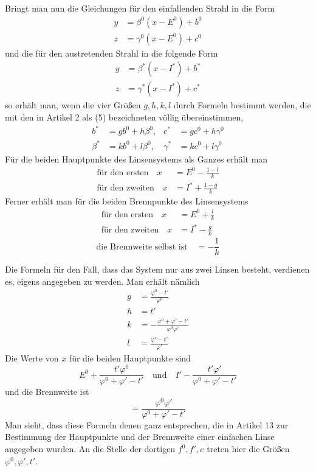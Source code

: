 Bringt man nun die Gleichungen für den einfallenden Strahl in die Form
\[
\begin{aligned}
y&=\beta^0(x-E^0)+b^0\\
z&=\gamma^0(x-E^0)+c^0
\end{aligned}
\]
und die für den austretenden Strahl in die folgende Form
\[
\begin{aligned}
y&=\beta^*(x-I^*)+b^*\\
z&=\gamma^*(x-I^*)+c^*
\end{aligned}
\]
so erhält man, wenn die vier Größen $g,h,k,l$ durch Formeln bestimmt werden, die mit den in Artikel 2 als (5) bezeichneten völlig übereinstimmen,
\[
\begin{aligned}
b^*&=gb^0+h\beta^0,&c^*&=gc^0+h\gamma^0\\
\beta^*&=kb^0+l\beta^0,&\gamma^*&=kc^0+l\gamma^0
\end{aligned}
\]
Für die beiden Hauptpunkte des Linsensystems als Ganzes erhält man
\[
\begin{aligned}
\text{für den ersten}\quad x&=E^0-\frac{1-l}{k}\\
\text{für den zweiten}\quad x&=I^*+\frac{1-g}{k}
\end{aligned}
\]
Ferner erhält man für die beiden Brennpunkte des Linsensystems
\[
\begin{aligned}
\text{für den ersten}\quad x&=E^0+\frac{l}{k}\\
\text{für den zweiten}\quad x&=I^*-\frac{g}{k}
\end{aligned}
\]
\[
\text{die Brennweite selbst ist}\quad=-\frac1k
\]

Die Formeln für den Fall, dass das System nur aus zwei Linsen besteht, verdienen es, eigens angegeben zu werden. Man erhält nämlich
\[
\begin{aligned}
g&=\frac{\varphi^0-t'}{\varphi^0}\\
h&=t'\\
k&=-\frac{\varphi^0+\varphi'-t'}{\varphi^0\varphi'}\\
l&=\frac{\varphi'-t'}{\varphi'}
\end{aligned}
\]
Die Werte von $x$ für die beiden Hauptpunkte sind
\[
E^0+\frac{t'\varphi^0}{\varphi^0+\varphi'-t'}\quad\text{und}\quad I'-\frac{t'\varphi'}{\varphi^0+\varphi'-t'}
\]
und die Brennweite ist
\[
=\frac{\varphi^0\varphi'}{\varphi^0+\varphi'-t'}
\]
Man sieht, dass diese Formeln denen ganz entsprechen, die in Artikel 13 zur Bestimmung der Hauptpunkte und der Brennweite einer einfachen Linse angegeben wurden. An die Stelle der dortigen $f^0,f',e$ treten hier die Größen $\varphi^0,\varphi',t'$.

